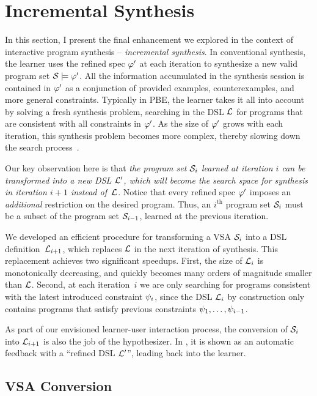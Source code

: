 \section{Incremental Synthesis}
\label{sec:interactive:incremental}

In this section, I present the final enhancement we explored in the context of interactive program synthesis --
\emph{incremental synthesis}.
In conventional synthesis, the learner uses the refined spec $\varphi'$ at each iteration to synthesize a new valid
program set $\mathcal{S} \models \varphi'$.
All the information accumulated in the synthesis session is contained in $\varphi'$ as a conjunction of provided examples,
counterexamples, and more general constraints.
Typically in PBE, the learner takes it all into account by solving a fresh synthesis problem, searching in the DSL
$\mathcal{L}$ for programs that are consistent with all constraints in $\varphi'$.
As the size of $\varphi'$ grows with each iteration, this synthesis problem becomes more complex, thereby slowing down the
search process~\cite{bitvectors}.

Our key observation here is that \emph{the program set $\mathcal{S}_i$ learned at iteration $i$ can be transformed into a new
    DSL $\mathcal{L}'$, which will become the search space for synthesis in iteration $i+1$ instead of~$\mathcal{L}$}.
Notice that every refined spec $\varphi'$ imposes an \emph{additional} restriction on the desired program.
Thus, an $i^{\text{th}}$ program set $\mathcal{S}_i$ must be a subset of the program set $\mathcal{S}_{i-1}$, learned at the previous
iteration.

We developed an efficient procedure for transforming a VSA $\mathcal{S}_i$ into a DSL definition~$\mathcal{L}_{i+1}$, which replaces
$\mathcal{L}$ in the next iteration of synthesis.
This replacement achieves two significant speedups.
First, the size of $\mathcal{L}_i$ is monotonically decreasing, and quickly becomes many orders of magnitude smaller than
$\mathcal{L}$.
Second, at each iteration~$i$ we are only searching for programs consistent with the latest introduced constraint
$\psi_i$, since the DSL $\mathcal{L}_i$ by construction only contains programs that satisfy previous constraints
$\psi_1, \dots, \psi_{i-1}$.

As part of our envisioned learner-user interaction process, the conversion of $\mathcal{S}_i$ into $\mathcal{L}_{i+1}$ is also the job
of the hypothesizer.
In , it is shown as an automatic feedback with a ``refined DSL $\mathcal{L}'$'', leading back
into the learner.

\subsection{VSA Conversion}

